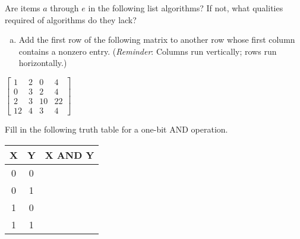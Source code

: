 \documentclass{report}
\begin{document}
\begin{center}

\newpage

\parbox{11.7cm}{
\begin{flushleft}
{Are items \(a\) through \(e\) in the following list algorithms? If not, what qualities required of algorithms do they lack?}

\begin{enumerate}[(a)]
    \item{Add the first row of the following matrix to another row whose first column contains a nonzero entry. (\textit{Reminder}: Columns run vertically; rows run horizontally.)}
\end{enumerate}
\end{flushleft}
}

$
\begin{bmatrix}
    1 & 2 & 0 & 4 \\
    0 & 3 & 2 & 4 \\
    2 & 3 & 10 & 22 \\
    12 & 4 & 3 & 4 
\end{bmatrix}
$

\vspace{5cm}

\parbox{11.5cm}{
\begin{flushleft}
{Fill in the following truth table for a one-bit AND operation.}    
\end{flushleft}
}
\begin{tabular}{c c|c}
\hline
X & Y & X AND Y \\
\hline
0 & 0 & \\
0 & 1 & \\
1 & 0 & \\
1 & 1 & \\
\hline
\end{tabular}

\end{center}
\end{document}
